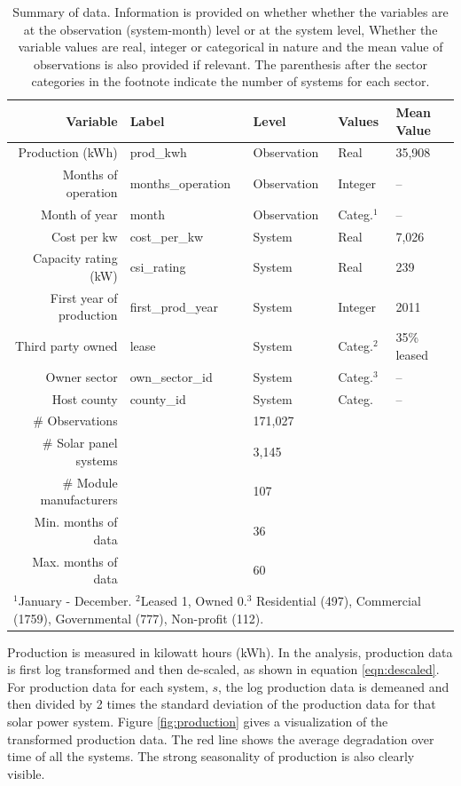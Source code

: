 \documentclass[a4paper]{article}
\begin{document}
\begin{table}
  \caption{Summary of data. Information is provided on whether whether the variables are at the observation (system-month) level or at the system level, Whether the variable values are real, integer or categorical in nature and the mean value of observations is also provided if relevant. The parenthesis after the sector categories in the footnote indicate the number of systems for each sector.}
  \begin{tabular}{rllll}
  \toprule
    Variable &  Label &   Level & Values &   Mean Value  \\
    \midrule
    Production (kWh) &  prod\_kwh &  Observation & Real & 35,908   \\
    Months of operation &  months\_operation &  Observation & Integer & --   \\
    Month of year & month & Observation & Categ.$^{1}$& -- \\
    Cost per kw & cost\_per\_kw & System & Real & 7,026 \\
    Capacity rating (kW) & csi\_rating & System & Real & 239 \\
    First year of production & first\_prod\_year & System & Integer & 2011 \\
    Third party owned & lease & System & Categ.$^{2}$  &  35\% leased \\
    Owner sector & own\_sector\_id & System & Categ.$^{3}$& -- \\
    Host county & county\_id & System & Categ. & -- \\
    \midrule
    \# Observations && 171,027 && \\
    \# Solar panel systems && 3,145 && \\
    \# Module manufacturers && 107 && \\
     Min. months of data && 36 && \\
     Max. months of data && 60 && \\
  \bottomrule
    \multicolumn{5}{l}{\scriptsize{$^{1}$January - December. $^{2}$Leased 1, Owned 0.$^{3}$ Residential (497), Commercial (1759), Governmental (777), Non-profit (112).}}
  \end{tabular}
  \label{tbl:variables}
\end{table}

Production is measured in kilowatt hours (kWh). In the analysis, production data is first log transformed and then de-scaled, as shown in equation \ref{eqn:descaled}. For production data for each system, $s$, the log production data is demeaned and then divided by 2 times the standard deviation of the production data for that solar power system. Figure \ref{fig:production} gives a visualization of the transformed production data. The red line shows the average degradation over time of all the systems. The strong seasonality of production is also clearly visible.
\end{document}
